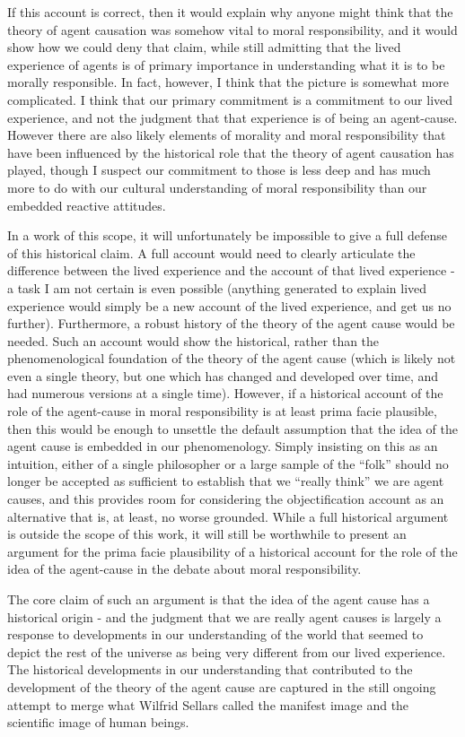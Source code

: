 \documentclass[phd,12pt,oneside,paper=letterpaper]{ubcthesis}
\begin{document}
If this account is correct, then it would explain why anyone might think that the theory of agent causation was somehow vital to moral responsibility, and it would show how we could deny that claim, while still admitting that the lived experience of agents is of primary importance in understanding what it is to be morally responsible. In fact, however, I think that the picture is somewhat more complicated. I think that our primary commitment is a commitment to our lived experience, and not the judgment that that experience is of being an agent-cause. However there are also likely elements of morality and moral responsibility that have been influenced by the historical role that the theory of agent causation has played, though I suspect our commitment to those is less deep and has much more to do with our cultural understanding of moral responsibility than our embedded reactive attitudes.

In a work of this scope, it will unfortunately be impossible to give a full defense of this historical claim. A full account would need to clearly articulate the difference between the lived experience and the account of that lived experience - a task I am not certain is even possible (anything generated to explain lived experience would simply be a new account of the lived experience, and get us no further). Furthermore, a robust history of the theory of the agent cause would be needed. Such an account would show the historical, rather than the phenomenological foundation of the theory of the agent cause (which is likely not even a single theory, but one which has changed and developed over time, and had numerous versions at a single time).
However, if a historical account of the role of the agent-cause in moral responsibility is at least prima facie plausible, then this would be enough to unsettle the default assumption that the idea of the agent cause is embedded in our phenomenology. Simply insisting on this as an intuition, either of a single philosopher or a large sample of the ``folk'' should no longer be accepted as sufficient to establish that we ``really think'' we are agent causes, and this provides room for considering the objectification account as an alternative that is, at least, no worse grounded. While a full historical argument is outside the scope of this work, it will still be worthwhile to present an argument for the prima facie plausibility of a historical account for the role of the idea of the agent-cause in the debate about moral responsibility. 

The core claim of such an argument is that the idea of the agent cause has a historical origin - and the judgment that we are really agent causes is largely a response to developments in our understanding of the world that seemed to depict the rest of the universe as being very different from our lived experience. The historical developments in our understanding that contributed to the development of the theory of the agent cause are captured in the still ongoing attempt to merge what Wilfrid Sellars called the manifest image and the scientific image of human beings. 
\end{document}
